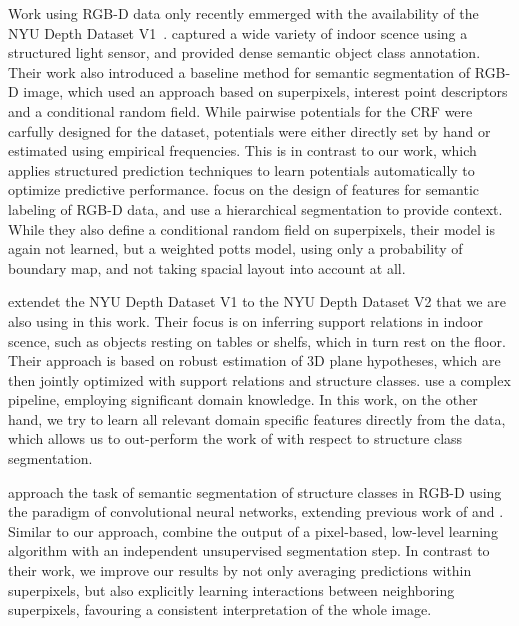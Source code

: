 \documentclass[a4paper, 10pt, conference]{ieeeconf}      %
\begin{document}
Work using RGB-D data only recently emmerged with
the availability of the NYU Depth Dataset V1~\citep{silberman2011indoor}.
\citet{silberman2011indoor} captured a wide variety of indoor scence using a structured light sensor,
and provided dense semantic object class annotation. Their work also introduced a baseline method
for semantic segmentation of RGB-D image, which used an approach based on superpixels, interest
point descriptors and a conditional random field. While pairwise potentials for the CRF were carfully
designed for the dataset, potentials were either directly set by hand or estimated using empirical
frequencies. This is in contrast to our work, which applies structured prediction techniques
to learn potentials automatically to optimize predictive performance.
\citet{ren2012rgb} focus on the design of features for semantic labeling of RGB-D data, and use
a hierarchical segmentation to provide context. While they also define a conditional random field on superpixels,
their model is again not learned, but a weighted potts model, using only a
probability of boundary map, and not taking spacial layout into account at all.

\citet{SilbermanECCV12} extendet the NYU Depth Dataset V1 to the NYU Depth Dataset V2 that we are also
using in this work.  Their focus is on inferring support relations in indoor
scence, such as objects resting on tables or shelfs, which in turn rest on the floor.
Their approach is based on robust estimation of 3D plane hypotheses, which are then jointly
optimized with support relations and structure classes.
\citet{SilbermanECCV12} use a complex pipeline, employing significant domain knowledge.
In this work, on the other hand, we try to learn all relevant domain specific features
directly from the data, which allows us to out-perform the work of \citet{SilbermanECCV12}
with respect to structure class segmentation.

\citet{couprie-iclr-13} approach the task of semantic segmentation of structure classes
in RGB-D using the paradigm of convolutional neural networks, extending
previous work of \citet{farabet-pami-13} and \citet{schulz2012learning}.
Similar to our approach, \citet{couprie-iclr-13} combine the output of a
pixel-based, low-level learning algorithm with an independent unsupervised
segmentation step. In contrast to their work, we improve our results by not
only averaging predictions within superpixels, but also explicitly learning
interactions between neighboring superpixels, favouring a consistent
interpretation of the whole image.
\end{document}
